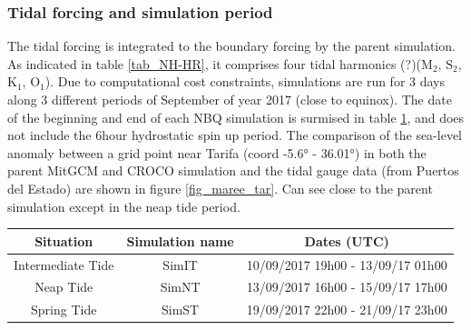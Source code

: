 \subsubsection{Tidal forcing and simulation period}
The tidal forcing is integrated to the boundary forcing by the parent simulation. As indicated in table \ref{tab_NH-HR},  it comprises four tidal harmonics (?)($\text{M}_{\text{2}}$, $\text{S}_{\text{2}}$, $\text{K}_{\text{1}}$, $\text{O}_{\text{1}}$). Due to computational cost constraints, simulations are run for 3 days along 3 different periods of September of year 2017 (close to equinox). The date of the beginning and end of each NBQ simulation is surmised in table \ref{tab_dates_MIV}, and does not include the 6hour hydrostatic spin up period. The comparison of the sea-level anomaly between a grid point near Tarifa (coord -5.6° - 36.01°) in both the parent MitGCM and CROCO simulation and the tidal gauge data (from Puertos del Estado) are shown in figure \ref{fig_maree_tar}. Can see close to the parent simulation except in the neap tide period.

\begin{table}[h]
        \centering
        \begin{tabular}{|c|c|c|}
                \hline
                Situation & Simulation name & Dates (UTC)\\
                \hline
                Intermediate Tide & SimIT & 10/09/2017 19h00 - 13/09/17 01h00  \\
                Neap Tide& SimNT & 13/09/2017 16h00 - 15/09/17 17h00 \\
                Spring Tide& SimST & 19/09/2017 22h00 - 21/09/17 23h00  \\
                \hline
        \end{tabular}
        \label{tab_dates_MIV}
\end{table}

